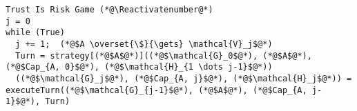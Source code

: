 \Suppressnumber
\begin{lstlisting}[label=trustisriskgame, style=numbers]
Trust Is Risk Game (*@\Reactivatenumber@*)
j = 0
while (True)
  j += 1;  (*@$A \overset{\$}{\gets} \mathcal{V}_j$@*)
  Turn = strategy[(*@$A$@*)]((*@$\mathcal{G}_0$@*), (*@$A$@*), (*@$Cap_{A, 0}$@*), (*@$\mathcal{H}_{1 \dots j-1}$@*))
  ((*@$\mathcal{G}_j$@*), (*@$Cap_{A, j}$@*), (*@$\mathcal{H}_j$@*)) = executeTurn((*@$\mathcal{G}_{j-1}$@*), (*@$A$@*), (*@$Cap_{A, j-1}$@*), Turn)
\end{lstlisting}
